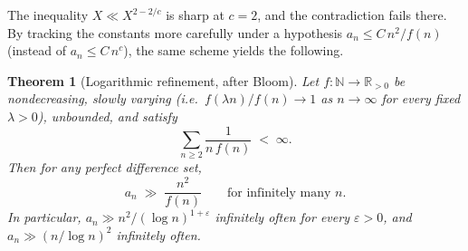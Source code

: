 \documentclass[11pt]{article}
\newtheorem{theorem}{Theorem}
\begin{document}
The inequality $X \ll X^{2-2/c}$ is sharp at $c = 2$, and the contradiction
fails there. By tracking the constants more carefully under a hypothesis
$a_n \leq C\, n^2 / f(n)$ (instead of $a_n \leq C\, n^c$), the same scheme
yields the following.

\begin{theorem}[Logarithmic refinement, after Bloom]\label{thm:n2overf}
Let $f \colon \mathbb{N} \to \mathbb{R}_{>0}$ be nondecreasing, slowly
varying (i.e.\ $f(\lambda n)/f(n) \to 1$ as $n \to \infty$ for every fixed
$\lambda > 0$), unbounded, and satisfy
\[
   \sum_{n \geq 2} \frac{1}{n\, f(n)} \;<\; \infty.
\]
Then for any perfect difference set,
\[
   a_n \;\gg\; \frac{n^2}{f(n)} \qquad \text{for infinitely many } n.
\]
In particular, $a_n \gg n^2 / (\log n)^{1 + \varepsilon}$ infinitely often
for every $\varepsilon > 0$, and $a_n \gg (n / \log n)^2$ infinitely often.
\end{theorem}
\end{document}
